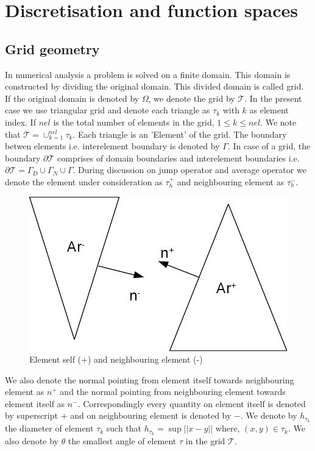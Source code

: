 \documentclass[a4paper,12pt]{book}
\begin{document}
\chapter{Discretisation and function spaces}
\section{Grid geometry}

In numerical analysis a problem is solved on a finite domain. This domain is constructed by dividing the original domain. This divided domain is called grid. If the original domain is denoted by $\Omega$, we denote the grid by $\mathcal{T}$. In the present case we use triangular grid and denote each triangle as $\tau_k$ with $k$ as element index. If $nel$ is the total number of elements in the grid, $1\leq k \leq nel$. We note that $\mathcal{T} = \cup_{k=1}^{nel} \tau_k$. Each triangle is an 'Element' of the grid. The boundary betwen elements i.e. interelement boundary is denoted by $\Gamma$. In case of a grid, the boundary $\partial \mathcal{T}$ comprises of domain boundaries and interelement boundaries i.e. $\partial \mathcal{T} = \Gamma_D \cup \Gamma_N \cup \Gamma$. During discussion on jump operator and average operator we denote the element under consideration as $\tau_{h}^+$ and neighbouring element as $\tau_{h}^-$. 

\begin{figure}[H]
\centering
  \includegraphics[width=\linewidth]{ch_3_fig_1.jpg}
  \caption{Element self (+) and neighbouring element (-)}
  \label{fig:Self_neighbour}
\end{figure}

We also denote the normal pointing from element itself towards neighbouring element as $n^+$ and the normal pointing from neighbouring element towards element itself as $n^-$. Correspondingly every quantity on element itself is denoted by superscript $+$ and on neighbouring element is denoted by $-$.  We denote by $h_{\tau_k}$ the diameter of element $\tau_k$ such that $h_{\tau_k} = \sup ||x-y||$ where, $(x,y) \in \tau_k$. We also denote by $\theta$ the smallest angle of element $\tau$ in the grid $\mathcal{T}$.
\end{document}
